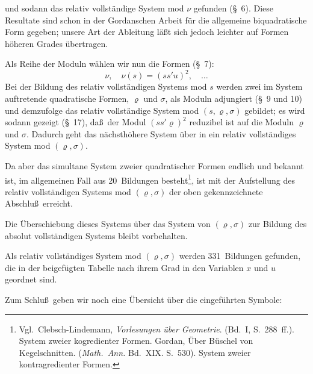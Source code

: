 \documentclass[11pt,a4paper]{article}
\theoremstyle{plain}
\theoremstyle{definition}
\begin{document}
\clearpage


und sodann das relativ vollst\"andige System mod $\nu$ gefunden (\S~6). Diese Resultate sind schon in der Gordanschen Arbeit f\"ur die allgemeine biquadratische Form gegeben; unsere Art der Ableitung l\"a\ss t sich jedoch leichter auf Formen h\"oheren Grades \"ubertragen.

Als Reihe der Moduln w\"ahlen wir nun die Formen (\S~7):
\[
\nu, \quad \nu(s) = (ss'u)^2, \quad \dots
\]
Bei der Bildung des relativ vollst\"andigen Systems mod $s$ werden zwei im System auftretende quadratische Formen, $\varrho$ und $\sigma$, als Moduln adjungiert (\S~9 und 10) und demzufolge das relativ vollst\"andige System mod $(s, \varrho, \sigma)$ gebildet; es wird sodann gezeigt (\S~17), da\ss\ der Modul $(ss'\varrho)^2$ reduzibel ist auf die Moduln $\varrho$ und $\sigma$. Dadurch geht das n\"achsth\"ohere System \"uber in ein relativ vollst\"andiges System mod $(\varrho, \sigma)$.

Da aber das simultane System zweier quadratischer Formen endlich und bekannt ist, im allgemeinen Fall aus 20~Bildungen besteht\footnote{Vgl.~Clebsch-Lindemann, \textit{Vorlesungen \"uber Geometrie}. (Bd.~I, S.~288~ff.). System zweier kogredienter Formen. Gordan, \"Uber B\"uschel von Kegelschnitten. (\textit{Math.~Ann.} Bd.~XIX. S.~530). System zweier kontragredienter Formen.}, ist mit der Aufstellung des relativ vollst\"andigen Systems mod $(\varrho, \sigma)$ der oben gekennzeichnete Abschlu\ss\ erreicht.

Die \"Uberschiebung dieses Systems \"uber das System von $(\varrho, \sigma)$ zur Bildung des absolut vollst\"andigen Systems bleibt vorbehalten.

Als relativ vollst\"andiges System mod $(\varrho, \sigma)$ werden 331~Bildungen gefunden, die in der beigef\"ugten Tabelle nach ihrem Grad in den Variablen $x$ und $u$ geordnet sind.

Zum Schlu\ss\ geben wir noch eine \"Ubersicht \"uber die eingef\"uhrten Symbole:
\end{document}
